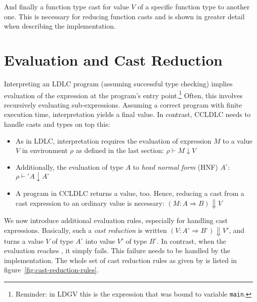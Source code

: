 And finally a function type cast for value $V$ of a specific function type to another one. This is necessary for reducing function casts and is shown in greater detail when describing the implementation.

\section{Evaluation and Cast Reduction}\label{sec:ccldlc-inference-rules}

Interpreting an LDLC program (assuming successful type checking) implies evaluation of the expression at the program's entry point.\footnote{Reminder: in LDGV this is the expression that was bound to variable \texttt{main}.} Often, this involves recursively evaluating sub-expressions. Assuming a correct program with finite execution time, interpretation yields a final value. In contrast, CCLDLC needs to handle casts and types on top this:

\begin{itemize}
\item As in LDLC, interpretation requires the evaluation of expression $M$ to a value $V$ in environment $\rho$ as defined in the last section:
	$\rho \vdash M \downarrow V$
\item Additionally, the evaluation of type $A$ to \emph{head normal form} (HNF) $A^\circ$:
	$\rho \vdash' A \downarrow A^\circ$
\item A program in CCLDLC returns a value, too. Hence, reducing a cast from a cast expression to an ordinary value is necessary: $(M : A \Rightarrow B) \Downarrow V$
\end{itemize}

We now introduce additional evaluation rules, especially for handling cast expressions. Basically, such a \emph{cast reduction} is written $(V : A^\circ \Rightarrow B^\circ) \Downarrow V'$, and turns a value $V$ of type $A^\circ$ into value $V'$ of type $B^\circ$. In contrast, when the evaluation reaches \blame, it simply fails. This failure needs to be handled by the implementation. The whole set of cast reduction rules as given by \cite{fu2021} is listed in figure~\ref{fig:cast-reduction-rules}.

